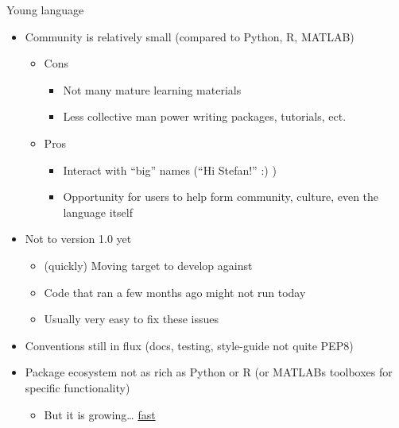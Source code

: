 \documentclass[compress,10pt]{beamer}
\begin{document}
\begin{frame}{Young language}

\begin{itemize}
\itemsep1pt\parskip0pt
\item
  Community is relatively small (compared to Python, R, MATLAB)

  \begin{itemize}
  \itemsep1pt\parskip0pt
  \item
    Cons

    \begin{itemize}
    \itemsep1pt\parskip0pt
    \item
      Not many mature learning materials
    \item
      Less collective man power writing packages, tutorials, ect.
    \end{itemize}
  \item
    Pros

    \begin{itemize}
    \itemsep1pt\parskip0pt
    \item
      Interact with ``big'' names (``Hi Stefan!'' :) )
    \item
      Opportunity for users to help form community, culture, even the
      language itself
    \end{itemize}
  \end{itemize}
\item
  Not to version 1.0 yet

  \begin{itemize}
  \itemsep1pt\parskip0pt
  \item
    (quickly) Moving target to develop against
  \item
    Code that ran a few months ago might not run today
  \item
    Usually very easy to fix these issues
  \end{itemize}
\item
  Conventions still in flux (docs, testing, style-guide not quite PEP8)
\item
  Package ecosystem not as rich as Python or R (or MATLABs toolboxes for
  specific functionality)

  \begin{itemize}
  \itemsep1pt\parskip0pt
  \item
    But it is growing\ldots{}
    \href{http://pkg.julialang.org/pulse.html}{fast}
  \end{itemize}
\end{itemize}

\end{frame}
\end{document}
